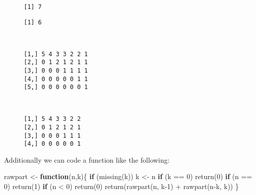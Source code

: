 \documentclass[
  letterpaper,
]{article}
\newenvironment{Shaded}{\begin{snugshade}}{\end{snugshade}}
\newcommand{\ControlFlowTok}[1]{\textcolor[rgb]{0.00,0.23,0.31}{\textbf{#1}}}
\newcommand{\DecValTok}[1]{\textcolor[rgb]{0.68,0.00,0.00}{#1}}
\newcommand{\FunctionTok}[1]{\textcolor[rgb]{0.28,0.35,0.67}{#1}}
\newcommand{\NormalTok}[1]{\textcolor[rgb]{0.00,0.23,0.31}{#1}}
\newcommand{\OtherTok}[1]{\textcolor[rgb]{0.00,0.23,0.31}{#1}}
\newcommand{\SpecialCharTok}[1]{\textcolor[rgb]{0.37,0.37,0.37}{#1}}
\begin{document}
\begin{figure}

\begin{minipage}{0.50\linewidth}

\begin{verbatim}
[1] 7
\end{verbatim}

\end{minipage}%
%
\begin{minipage}{0.50\linewidth}

\begin{verbatim}
[1] 6
\end{verbatim}

\end{minipage}%
\newline
\begin{minipage}{0.50\linewidth}

\begin{verbatim}

                   
[1,] 5 4 3 3 2 2 1 
[2,] 0 1 2 1 2 1 1 
[3,] 0 0 0 1 1 1 1 
[4,] 0 0 0 0 0 1 1 
[5,] 0 0 0 0 0 0 1 
    
\end{verbatim}

\end{minipage}%
%
\begin{minipage}{0.50\linewidth}

\begin{verbatim}
                
[1,] 5 4 3 3 2 2
[2,] 0 1 2 1 2 1
[3,] 0 0 0 1 1 1
[4,] 0 0 0 0 0 1
\end{verbatim}

\end{minipage}%

\end{figure}%

\vspace{0.2cm}

Additionally we can code a function like the following: \vspace{0.2cm}

\begin{Shaded}
\begin{Highlighting}[]
\NormalTok{rawpart }\OtherTok{\textless{}{-}} \ControlFlowTok{function}\NormalTok{(n,k)\{}
  \ControlFlowTok{if}\NormalTok{ (}\FunctionTok{missing}\NormalTok{(k)) k }\OtherTok{\textless{}{-}}\NormalTok{ n}
  \ControlFlowTok{if}\NormalTok{ (k }\SpecialCharTok{==} \DecValTok{0}\NormalTok{) }\FunctionTok{return}\NormalTok{(}\DecValTok{0}\NormalTok{)}
  \ControlFlowTok{if}\NormalTok{ (n }\SpecialCharTok{==} \DecValTok{0}\NormalTok{) }\FunctionTok{return}\NormalTok{(}\DecValTok{1}\NormalTok{)}
  \ControlFlowTok{if}\NormalTok{ (n }\SpecialCharTok{\textless{}} \DecValTok{0}\NormalTok{) }\FunctionTok{return}\NormalTok{(}\DecValTok{0}\NormalTok{)}
  \FunctionTok{return}\NormalTok{(}\FunctionTok{rawpart}\NormalTok{(n, k}\DecValTok{{-}1}\NormalTok{) }\SpecialCharTok{+} \FunctionTok{rawpart}\NormalTok{(n}\SpecialCharTok{{-}}\NormalTok{k, k))}
\NormalTok{\}}
\end{Highlighting}
\end{Shaded}
\end{document}
